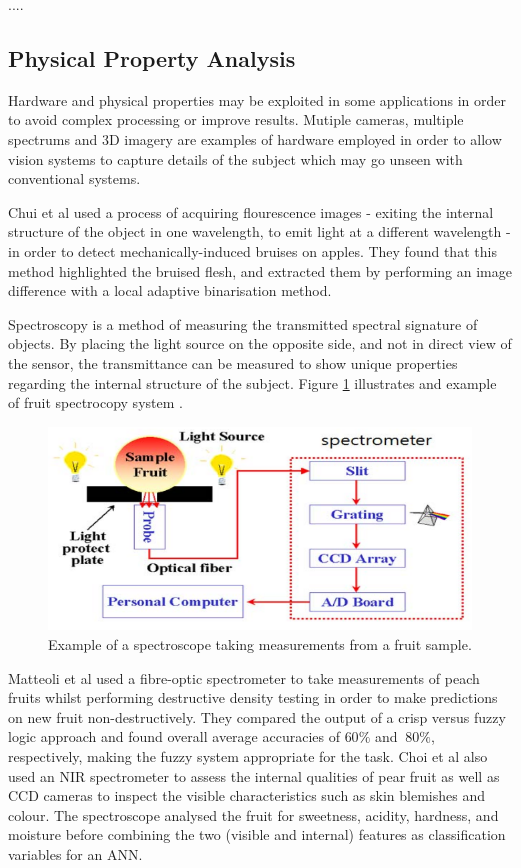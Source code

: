 \documentclass[fleqn,twoside]{article}
\begin{document}
....






\subsection{Physical Property Analysis}

Hardware and physical properties may be exploited in some applications in order to avoid complex processing or improve results. Mutiple cameras, multiple spectrums and 3D imagery are examples of hardware employed in order to allow vision systems to capture details of the subject which may go unseen with conventional systems. 


Chui et al\cite{chiu} used a process of acquiring flourescence images - exiting the internal structure of the object in one wavelength, to emit light at a different wavelength - in order to detect mechanically-induced bruises on apples. They found that this method highlighted the bruised flesh, and extracted them by performing an image difference with a local adaptive binarisation method. 


Spectroscopy is a method of measuring the transmitted spectral signature of objects. By placing the light source on the opposite side, and not in direct view of the sensor, the transmittance can be measured to show unique properties regarding the internal structure of the subject. Figure \ref{fig:spectroscope} illustrates and example of fruit spectrocopy system \cite{choi}. 

\begin{figure}[h]
	\centering
	\includegraphics[width=0.7\linewidth]{spectroscope.png}
	\caption{Example of a spectroscope taking measurements from a fruit sample.}
	\label{fig:spectroscope}
\end{figure}%


Matteoli et al \cite{matteoli} used a fibre-optic spectrometer to take measurements of peach fruits whilst performing destructive density testing in order to make predictions on new fruit non-destructively. They compared the output of a crisp versus fuzzy logic approach and found overall average accuracies of $60\%$ and $~80\%$, respectively, making the fuzzy system appropriate for the task. Choi et al \cite{choi} also used an NIR spectrometer to assess the internal qualities of pear fruit as well as CCD cameras to inspect the visible characteristics such as skin blemishes and colour. The spectroscope analysed the fruit for sweetness, acidity, hardness, and moisture before combining the two (visible and internal) features as classification variables for an ANN. 
\end{document}
